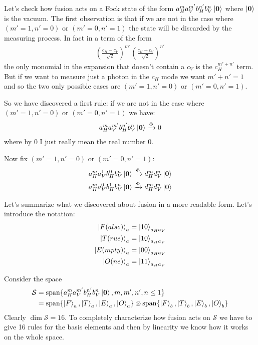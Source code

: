 \documentclass{article}
\DeclareMathOperator{\spn}{span}
\begin{document}
Let's check how fusion acts on a Fock state of the form $a_H^m a_V^{m'} b_H^{n'}b_V^{n}\ket{\mathbf{0}}$ where $\ket{\mathbf{0}}$ is the vacuum. The first observation is that if we are not in the case where $(m' = 1, n' = 0)$ or $(m' = 0, n' = 1)$ the state will be discarded by the measuring process. In fact in a term of the form
\begin{align*}
    \left(\frac{c_H-c_V}{\sqrt{2}}\right)^{m'} \left(\frac{c_H+c_V}{\sqrt{2}}\right)^{n'}
\end{align*}
the only monomial in the expansion that doesn't contain a $c_V$ is the $c_H^{m'+n'}$ term. But if we want to measure just a photon in the $c_H$ mode we want $m'+n'=1$ and so the two only possible cases are $(m' = 1, n' = 0)$ or $(m'=0, n'=1)$. 

So we have discovered a first rule: if we are not in the case where $(m' = 1, n' = 0)$ or $(m'=0, n'=1)$ we have:
\begin{align}
    \label{destroy}
    a_H^m a_V^{m'} b_H^{n'}b_V^{n}\ket{\mathbf{0}} \xrightarrow{\Phi} 0 
\end{align}
where by $0$ I just really mean the real number 0.

Now fix $(m' = 1, n' = 0)$ or $(m'=0, n'=1)$:
\begin{align}
    \label{keep1}
    a_H^m a_V^{1} b_H^{0}b_V^{n}\ket{\mathbf{0}} \xrightarrow{\Phi} d_H^{m} d_V^{n}\ket{\mathbf{0}} \\
    \label{keep2}
    a_H^m a_V^{0} b_H^{1}b_V^{n}\ket{\mathbf{0}} \xrightarrow{\Phi} d_H^{m} d_V^{n}\ket{\mathbf{0}}
\end{align}

Let's summarize what we discovered about fusion in a more readable form. Let's introduce the notation:
\begin{align*}
   \ket{F(alse)}_a = \ket{10}_{a_Ha_V} \\
   \ket{T(rue)}_a = \ket{10}_{a_Ha_V} \\
   \ket{E(mpty)}_a = \ket{00}_{a_Ha_V}\\
   \ket{O(ne)}_a = \ket{11}_{a_Ha_V}
\end{align*}

Consider the space 
\begin{align}
\label{goodset}
\nonumber
\mathcal{S} &= \spn\{a_H^m a_V^{m'} b_H^{n'}b_V^{n}\ket{\mathbf{0}}, m, m', n', n \leq 1\} \\&= \spn\{\ket{F}_a, \ket{T}_a, \ket{E}_a, \ket{O}_a\} \otimes \spn\{\ket{F}_b, \ket{T}_b, \ket{E}_b, \ket{O}_b\} 
\end{align}
Clearly $\dim\mathcal{S} = 16$. To completely characterize how fusion acts on $\mathcal{S}$ we have to give 16 rules for the basis elements and then by linearity we know how it works on the whole space.
\end{document}
